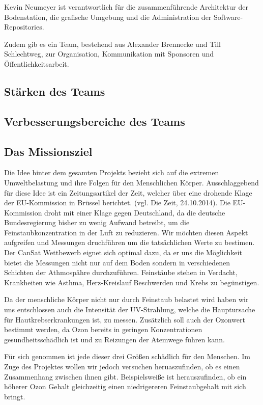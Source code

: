 Kevin Neumeyer ist verantwortlich für die zusammenführende Architektur der Bodenstation, die grafische Umgebung und die Administration der Software-Repositories.

Zudem gib es ein Team, bestehend aus Alexander Brennecke und Till Schlechtweg, zur Organisation, Kommunikation mit Sponsoren und Öffentlichkeitsarbeit.

\subsection{Stärken des Teams}

\subsection{Verbesserungsbereiche des Teams}

\subsection{Das Missionsziel}

Die Idee hinter dem gesamten Projekts bezieht sich auf die extremen Umweltbelastung und ihre Folgen für den Menschlichen Körper. Ausschlaggebend für diese Idee ist ein Zeitungsartikel der Zeit, welcher über eine drohende Klage der EU-Kommission in Brüssel berichtet. (vgl. Die Zeit, 24.10.2014). Die EU-Kommission droht mit einer Klage gegen Deutschland, da die deutsche Bundesregierung bisher zu wenig Aufwand betreibt, um die Feinstaubkonzentration in der Luft zu reduzieren. Wir möchten diesen Aspekt aufgreifen und Messungen druchführen um die tatsächlichen Werte zu bestimen. Der CanSat Wettbewerb eignet sich optimal dazu, da er uns die Möglichkeit bietet die Messungen nicht nur auf dem Boden sondern in verschiedenen Schichten der Athmospähre durchzuführen. Feinstäube stehen in Verdacht, Krankheiten wie Asthma, Herz-Kreislauf Beschwerden und Krebs zu begünstigen.

Da der menschliche Körper nicht nur durch Feinstaub belastet wird haben wir uns entschlossen auch die Intensität der UV-Strahlung, welche die Hauptursache für Hautkrebserkrankungen ist, zu messen. Zusätzlich soll auch der Ozonwert bestimmt werden, da Ozon bereits in geringen Konzentrationen gesundheitsschädlich ist und zu Reizungen der Atemwege führen kann.

Für sich genommen ist jede dieser drei Größen schädlich für den Menschen. Im Zuge des Projektes wollen wir jedoch versuchen heruaszufinden, ob es einen Zusammenhang zwischen ihnen gibt. Beispielsweiße ist herauszufinden, ob ein höherer Ozon Gehalt gleichzeitig einen niedrigereren Feinstaubgehalt mit sich bringt.

